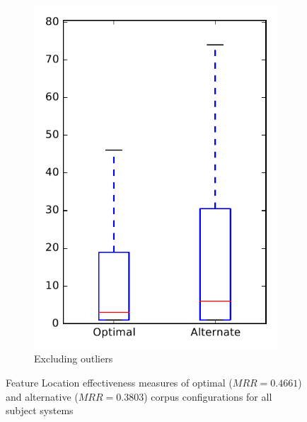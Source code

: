 \begin{figure}
\begin{subfigure}{.4\textwidth}
        \includegraphics[height=0.4\textheight]{figures/combo/flt_rq2_overview_no_outlier}
        \caption{Excluding outliers}\label{fig:combo:flt:rq2:overview_no_outlier}
    \end{subfigure}
\caption{Feature Location effectiveness measures of optimal ($MRR=0.4661$) and alternative ($MRR=0.3803$) corpus configurations for all subject systems}
\label{fig:combo:flt:rq2:overview}
\end{figure}
